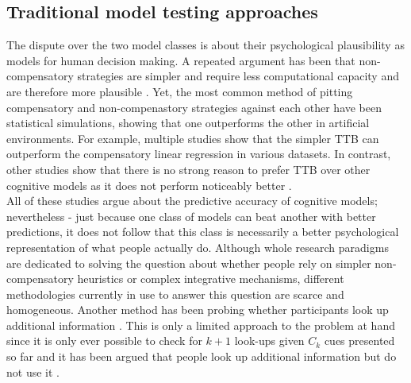 \documentclass[10pt,letterpaper]{article}
\begin{document}
\subsection{Traditional model testing approaches}
The dispute over the two model classes is about their psychological plausibility as models for human decision making. A repeated argument has been that non-compensatory strategies are simpler and require less computational capacity and are therefore more plausible \citep{todd2000precis}. Yet, the most common method of pitting compensatory and non-compenastory strategies against each other have been statistical simulations, showing that one outperforms the other in artificial environments. For example, multiple studies show that the simpler TTB can outperform the compensatory linear regression \citep{czerlinski1999good} in various datasets. In contrast, other studies show that there is no strong reason to prefer TTB over other cognitive models as it does not perform noticeably better \citep{chater2003fast, schulz2014predict}.\\
All of these studies argue about the predictive accuracy of cognitive models; nevertheless - just because one class of models can beat another with better predictions, it does not follow that this class is necessarily a better psychological representation of what people actually do. Although whole research paradigms are dedicated to solving the question about whether people rely on simpler non-compensatory heuristics or complex integrative mechanisms, different methodologies currently in use to answer this question are scarce and homogeneous. Another method has been probing whether participants look up additional information \citep{newell2003empirical}. This is only a limited approach to the problem at hand  since it is only ever possible to check for $k+1$ look-ups given $C_k$ cues presented so far and it has been argued that people look up additional information but do not use it \citep{marewski2011using}.\\
\end{document}
